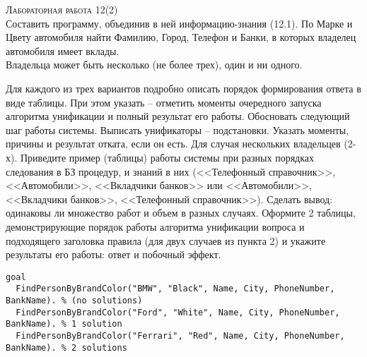 \textsc{\huge Лабораторная работа 12(2)} \\
Составить программу, объединив в ней информацию-знания (12.1).
По Марке и Цвету автомобиля найти Фамилию, Город, Телефон и Банки, в которых владелец автомобиля имеет вклады. \\
Владельца может быть несколько (не более трех), один и ни одного. \\
\begin{tasks}[label=\arabic*]
	\task Для каждого из трех вариантов подробно описать порядок формирования ответа в виде таблицы. При этом указать -- отметить моменты очередного запуска алгоритма унификации и полный результат его работы. Обосновать следующий шаг работы системы. Выписать унификаторы – подстановки. Указать моменты, причины и результат отката, если он есть.
	\task Для случая нескольких владельцев (2-х). Приведите пример (таблицы)
	работы системы при разных порядках следования в БЗ процедур, и знаний в них (<<Телефонный справочник>>, <<Автомобили>>, <<Вкладчики банков>> или <<Автомобили>>, <<Вкладчики банков>>, <<Телефонный справочник>>). Сделать вывод: одинаковы ли множество работ и объем в разных случаях.
	\task Оформите 2 таблицы, демонстрирующие порядок работы алгоритма
	унификации вопроса и подходящего заголовка правила (для двух случаев из пункта 2) и укажите результаты его работы: ответ и побочный
	эффект.
\end{tasks}
\begin{lstlisting}
goal
  FindPersonByBrandColor("BMW", "Black", Name, City, PhoneNumber, BankName). % (no solutions)
  FindPersonByBrandColor("Ford", "White", Name, City, PhoneNumber, BankName). % 1 solution
  FindPersonByBrandColor("Ferrari", "Red", Name, City, PhoneNumber, BankName). % 2 solutions
\end{lstlisting}


